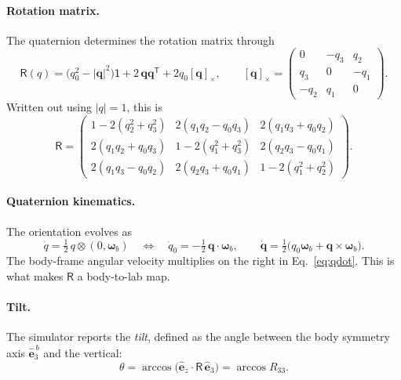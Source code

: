 \documentclass[11pt]{article}
\newcommand{\vect}[1]{\bm{#1}}
\newcommand{\tens}[1]{\mathsf{#1}}
\newcommand{\ez}{\hat{\vect{e}}_z}
\newcommand{\Rm}{\tens{R}}
\newcommand{\T}{^{\mathsf{T}}}
\theoremstyle{remark}
\begin{document}
\paragraph{Rotation matrix.} The quaternion determines the rotation
matrix through
\begin{equation}
  \Rm(q) = \bigl(q_0^2-|\vect{q}|^2\bigr)\tens{1}
         + 2\,\vect{q}\vect{q}\T + 2q_0[\vect{q}]_\times ,
  \qquad
  [\vect{q}]_\times =
  \begin{pmatrix}
    0 & -q_3 & q_2\\ q_3 & 0 & -q_1\\ -q_2 & q_1 & 0
  \end{pmatrix}.
\end{equation}
Written out using $|q|=1$, this is
\begin{equation}
  \Rm =
  \begin{pmatrix}
    1-2(q_2^2+q_3^2) & 2(q_1q_2-q_0q_3) & 2(q_1q_3+q_0q_2)\\
    2(q_1q_2+q_0q_3) & 1-2(q_1^2+q_3^2) & 2(q_2q_3-q_0q_1)\\
    2(q_1q_3-q_0q_2) & 2(q_2q_3+q_0q_1) & 1-2(q_1^2+q_2^2)
  \end{pmatrix}.
\end{equation}

\paragraph{Quaternion kinematics.} The orientation evolves as
\begin{equation}
  \dot q = \tfrac12\, q\otimes(0,\vect{\omega}_b)
  \quad\Longleftrightarrow\quad
  \dot q_0 = -\tfrac12\,\vect{q}\cdot\vect{\omega}_b, \qquad
  \dot{\vect{q}} = \tfrac12\bigl(q_0\vect{\omega}_b + \vect{q}\times\vect{\omega}_b\bigr).
  \label{eq:qdot}
\end{equation}
The body-frame angular velocity multiplies on the right in
Eq.~\eqref{eq:qdot}. This is what makes $\Rm$ a body-to-lab map.

\paragraph{Tilt.} The simulator reports the \emph{tilt}, defined as the angle
between the body symmetry axis $\hat{\vect{e}}_3^{\,b}$ and the vertical:
\begin{equation}
  \theta = \arccos\bigl(\ez\cdot\Rm\,\hat{\vect{e}}_3\bigr) = \arccos R_{33}.
\end{equation}
\end{document}
